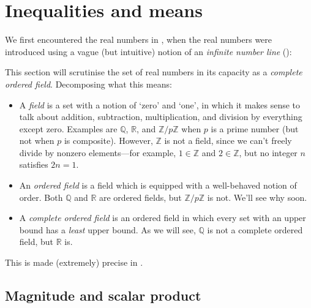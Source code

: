 \section{Inequalities and means}

We first encountered the real numbers in , when the real numbers were introduced using a vague (but intuitive) notion of an \textit{infinite number line} ():

\begin{center}
\end{center}

This section will scrutinise the set of real numbers in its capacity as a \textit{complete ordered field}. Decomposing what this means:
\begin{itemize} 
\item A \textit{field} is a set with a notion of `zero' and `one', in which it makes sense to talk about addition, subtraction, multiplication, and division by everything except zero. Examples are $\mathbb{Q}$, $\mathbb{R}$, and $\mathbb{Z}/p\mathbb{Z}$ when $p$ is a prime number (but not when $p$ is composite). However, $\mathbb{Z}$ is not a field, since we can't freely divide by nonzero elements---for example, $1 \in \mathbb{Z}$ and $2 \in \mathbb{Z}$, but no integer $n$ satisfies $2n=1$.
\item An \textit{ordered field} is a field which is equipped with a well-behaved notion of order. Both $\mathbb{Q}$ and $\mathbb{R}$ are ordered fields, but $\mathbb{Z}/p\mathbb{Z}$ is not. We'll see why soon.
\item A \textit{complete ordered field} is an ordered field in which every set with an upper bound has a \textit{least} upper bound. As we will see, $\mathbb{Q}$ is not a complete ordered field, but $\mathbb{R}$ is.
\end{itemize}

This is made (extremely) precise in .

\subsection*{Magnitude and scalar product}

